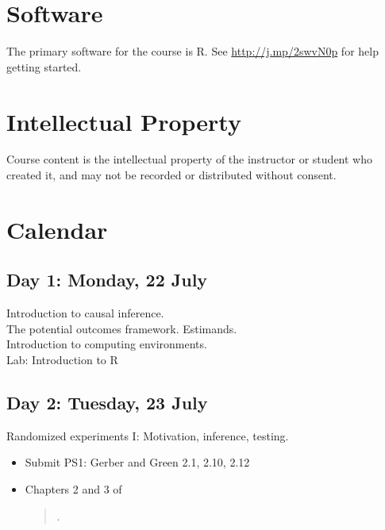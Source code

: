 \documentclass[11pt]{article}
\newcommand{\bibverse}[1]{\begin{verse} \bibentry{#1}. \end{verse}}
\begin{document}
\section*{Software}

The primary software for the course is R.  See \href{http://www.ryantmoore.org/files/class/introPolResearch/intro_R_short.pdf}{http://j.mp/2swvN0p}
for help getting started.   

\section*{Intellectual Property}
Course content is the intellectual property of the instructor or student who created it, and may not be recorded or distributed without consent.




\section*{Calendar}
\renewcommand{\labelitemi}{$\square$}

	\subsection*{Day 1: Monday, 22 July}
	Introduction to causal inference.\\
	The potential outcomes framework.  Estimands.\\
	Introduction to computing environments. \\
Lab: Introduction to R


\subsection*{Day 2: Tuesday, 23 July}
Randomized experiments I: Motivation, inference, testing.


\begin{itemize}
	\item Submit PS1: Gerber and Green 2.1, 2.10, 2.12
	\item Chapters 2 and 3 of \bibverse{gergre12}
\end{itemize}
\end{document}

